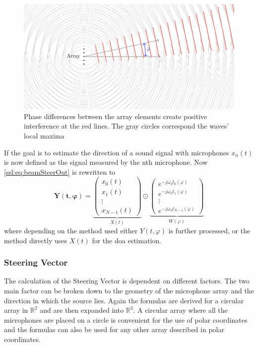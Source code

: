\begin{figure}
	\centering
	\includegraphics[]{beamforming_1.pdf}
	\caption{Phase differences between the array elements create positive interference at the red lines.
		The gray circles correspond the waves' local maxima}
	\label{ssl:fig:beamforming1}
\end{figure}

If the goal is to estimate the direction of a sound signal with microphones 
$x_n(t)$ is now defined as the signal measured by the nth microphone.
Now \eqref{ssl:eq:beamSteerOut} is rewritten to 
\begin{equation}
  \label{ssl:eq:beamSteerIn}
  \bm{Y(t, \varphi)} = 
    \underbrace{
      \begin{pmatrix} 
        x_0(t) \\ 
        x_1(t) \\
        \vdots \\ 
        x_{N-1}(t)
    \end{pmatrix}}_{X(t)}
    \odot
    \underbrace{
      \begin{pmatrix} 
        e^{-j\omega_0 t_0(\varphi)} \\ 
        e^{-j\omega_0 t_1(\varphi)} \\
        \vdots \\ 
        e^{-j\omega_0 t_{N-1}(\varphi)} 
      \end{pmatrix}}_{W(\varphi)}
\end{equation}
where depending on the method used either $Y(t, \varphi)$ is further processed, or the 
method directly uses $X(t)$ for the \acrshort*{doa} estimation.

\subsubsection{Steering Vector}
The calculation of the Steering Vector is dependent on different factors.
The two main factor can be broken down to the geometry of the microphone array
and the direction in which the source lies. 
Again the formulas are derived for a circular array in $\mathbb{R}^2$ and are then expanded into $\mathbb{R}^3$.
A circular array where all the microphones are 
placed on a circle is convenient for the use of polar coordinates and the 
formulas can also be used for any other array described in polar coordinates.

